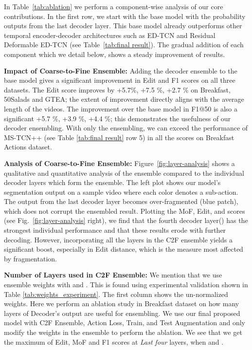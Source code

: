 \documentclass[10pt,twocolumn,letterpaper]{article}
\begin{document}
In Table~\ref{tab:ablation} we perform a component-wise analysis of our core contributions.  In the first row, we start with the base model  with the probability outputs  from the last decoder layer.  This base model already outperforms other temporal encoder-decoder architectures such as ED-TCN \cite{TED-lea2017temporal} and Residual Deformable ED-TCN \cite{TEDresi-lei2018temporal} (see Table~\ref{tab:final result}).  The gradual addition of each component which we detail below, shows a steady improvement of results. 
 

\textbf{Impact of Coarse-to-Fine Ensemble:} Adding the decoder ensemble to the base model gives a significant improvement in Edit and F1 scores on all three datasets. The Edit score improves by +5.7\%, +7.5 \%, +2.7 \% on Breakfast, 50Salads and GTEA; the extent of improvement directly aligns with the average length of the videos. The improvement over the base model in F1@50 is also a significant +5.7 \%, +3.9 \%, +4.4 \%; this demonstrates the usefulness of our decoder ensembling. With only the ensembling, we can exceed the performance of MS-TCN++ (see Table \ref{tab:final result} row 5) in all the scores on Breakfast Actions dataset. 


\textbf{Analysis of Coarse-to-Fine Ensemble:} 
Figure~\ref{fig:layer-analysis} shows a qualitative and quantitative analysis of the ensemble compared to the individual decoder layers  which form the ensemble. The left plot shows our model's segmentation output on a sample video where each color denotes a sub-action. The output from the last decoder layer  becomes over-fragmented (blue patch), which does not corrupt the ensembled result. Plotting the MoF, Edit, and  scores (see Fig.~\ref{fig:layer-analysis} right), we find that the fourth decoder layer() has the strongest individual performance and that these results erode with further decoding.  However, incorporating all the layers in the C2F ensemble yields a significant boost, especially in Edit distance, which is the measure most affected by fragmentation.

\textbf{Number of Layers used in C2F Ensemble:}
We mention that we use ensemble weights with  and . This is found using experimental validation shown in Table \ref{tab:weights_experiment}. The first column shows the un-normalized weights. Here we perform an ablation study in Breakfast dataset on how many layers of Decoder's output are useful for ensembling. We use our final proposed model with C2F Ensemble, Action Loss, Train, and Test Augmentation and only modify the weights  in the ensemble to perform the ablation. We see that we get the maximum of Edit, MoF and F1 scores at \textit{Last four} layers, \ie when  and .
\end{document}
